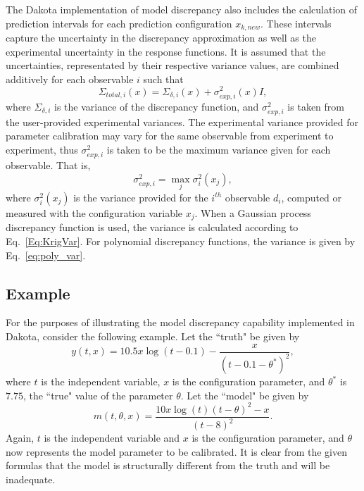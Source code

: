 The Dakota implementation of model discrepancy also includes the calculation
of prediction intervals for each prediction configuration $x_{k,new}$. These
intervals capture the uncertainty in the discrepancy approximation as well as
the experimental uncertainty in the response functions. It is assumed that the
uncertainties, representated by their respective variance values, are combined 
additively for each observable $i$ such that
\begin{equation}\label{eq:md_totalvar}
\Sigma_{total,i}(x) = \Sigma_{\delta,i}(x) + \sigma^2_{exp,i}(x)I,
\end{equation} 
where $\Sigma_{\delta,i}$ is the variance of the discrepancy function, and
$\sigma^2_{exp,i}$ is taken from the user-provided experimental variances.
The experimental variance provided for parameter calibration may vary for the
same observable from experiment to experiment, thus $\sigma^{2}_{exp,i}$ is
taken to be the maximum variance given for each observable. That is,
\begin{equation}
\sigma^2_{exp,i} = \max_{j} \sigma^2_{i}(x_j), 
\end{equation}
where $\sigma^2_{i}(x_j)$ is the variance provided for the $i^{th}$ observable
$d_i$, computed or measured with the configuration variable $x_j$. 
When a Gaussian process discrepancy function is used, the variance is calculated
according to Eq.~\ref{Eq:KrigVar}. For polynomial discrepancy functions, the
variance is given by Eq.~\ref{eq:poly_var}. 



\subsection{Example}

For the purposes of illustrating the model discrepancy capability implemented
in Dakota, consider the following example. Let the ``truth" be given by
\begin{equation}\label{eq:md_truth}
y(t,x) = 10.5 x \log(t-0.1) - \frac{x}{(t-0.1-\theta^{*})^2},
\end{equation}
where $t$ is the independent variable, $x$ is the configuration parameter, and
$\theta^{*}$ is $7.75$, the ``true" value of the parameter $\theta$. Let the
``model" be given by
\begin{equation}\label{eq:md_model}
m(t,\theta, x) = \frac{10 x \log(t) (t-\theta)^2 - x}{(t-8)^2}. 
\end{equation}
Again, $t$ is the independent variable and $x$ is the configuration parameter,
and $\theta$ now represents the model parameter to be calibrated. It is clear
from the given formulas that the model is structurally different from the truth
and will be inadequate. 

